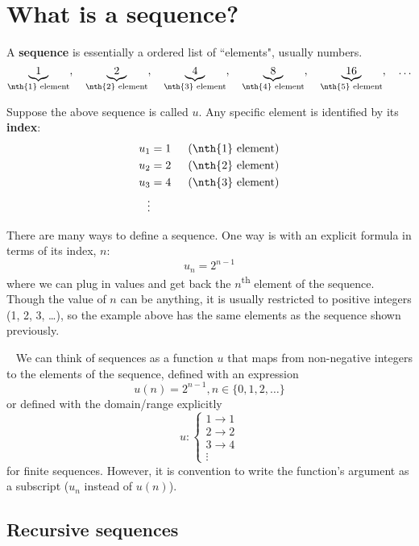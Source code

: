 \documentclass[../../main.tex]{subfiles}
\begin{document}

\section{What is a sequence?}

A \textbf{sequence} is essentially a ordered list of ``elements", usually numbers.
\[
    \underbrace{1}_\text{\nth{1} element},\quad
    \underbrace{2}_\text{\nth{2} element},\quad
    \underbrace{4}_\text{\nth{3} element},\quad
    \underbrace{8}_\text{\nth{4} element},\quad
    \underbrace{16}_\text{\nth{5} element},\quad
    \ldots
\]

\noindent Suppose the above sequence is called \(u\). Any specific element is identified by its \textbf{index}:
\begin{align}
    u_1 &= 1 \indent (\text{\nth{1} element})\\
    u_2 &= 2 \indent (\text{\nth{2} element})\\
    u_3 &= 4 \indent (\text{\nth{3} element})\\
    \vdots
\end{align}

There are many ways to define a sequence. One way is with an explicit formula in terms of its index, \(n\):
\[
    u_n = 2^{n-1}
\]
where we can plug in values and get back the \(n\)\textsuperscript{th} element of the sequence. Though the value of \(n\) can be anything, it is usually restricted to positive integers (1, 2, 3, \ldots), so the example above has the same elements as the sequence shown previously.

\begin{insight}{~}
We can think of sequences as a function \(u\) that maps from non-negative integers to the elements of the sequence, defined with an expression
\[
    u(n) = 2^{n-1}, n\in\{0, 1, 2, \ldots\}
\]
or defined with the domain/range explicitly
\[
    u: \begin{cases}
    1\to1\\
    2\to2\\
    3\to4\\
    \vdots
    \end{cases}
\]
for finite sequences. However, it is convention to write the function's argument as a subscript ($ u_n$ instead of $u(n)$).
\end{insight}

\subsection{Recursive sequences}
\end{document}
